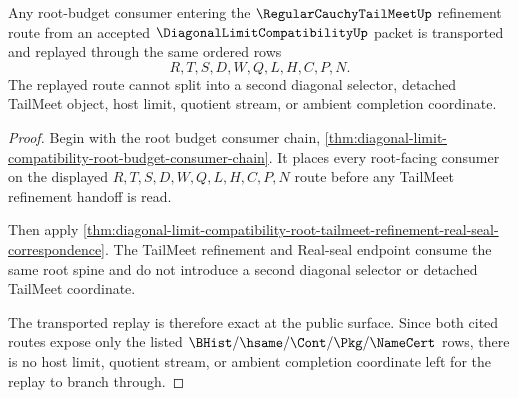 \begin{theorem}
\label{thm:diagonal-limit-compatibility-root-transport-replay-exactness}
Any root-budget consumer entering the $\RegularCauchyTailMeetUp$ refinement
route from an accepted $\DiagonalLimitCompatibilityUp$ packet is transported and
replayed through the same ordered rows
$$
R,T,S,D,W,Q,L,H,C,P,N.
$$
The replayed route cannot split into a second diagonal selector, detached
TailMeet object, host limit, quotient stream, or ambient completion coordinate.
\end{theorem}
\begin{proof}
Begin with the root budget consumer chain,
\autoref{thm:diagonal-limit-compatibility-root-budget-consumer-chain}. It
places every root-facing consumer on the displayed
$R,T,S,D,W,Q,L,H,C,P,N$ route before any TailMeet refinement handoff is read.

Then apply
\autoref{thm:diagonal-limit-compatibility-root-tailmeet-refinement-real-seal-correspondence}.
The TailMeet refinement and Real-seal endpoint consume the same root spine and
do not introduce a second diagonal selector or detached TailMeet coordinate.

The transported replay is therefore exact at the public surface. Since both
cited routes expose only the listed $\BHist/\hsame/\Cont/\Pkg/\NameCert$ rows,
there is no host limit, quotient stream, or ambient completion coordinate left
for the replay to branch through.
\end{proof}


